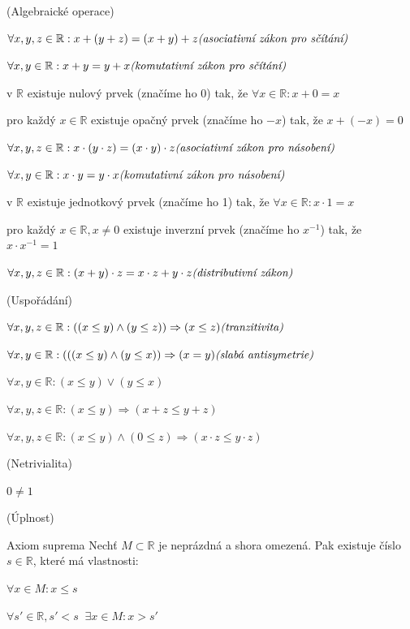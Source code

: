\begin{penumerate}
	\item (Algebraické operace)
	\begin{penumerate}
		\item $\forall x,y,z \in \mathbb{R} : x+(y+z) = (x+y)+z \hfill\textit{(asociativní zákon pro sčítání)}$
		\item $\forall x,y \in \mathbb{R} : x+y = y+x \hfill\textit{(komutativní zákon pro sčítání)}$
		\item v $\mathbb{R}$ existuje nulový prvek (značíme ho 0) tak, že $\forall x \in \mathbb{R}: x+0 = x$
		\item pro každý $x \in \mathbb{R}$ existuje opačný prvek (značíme ho $-x$) tak, že $x+(-x)=0$
		\item $\forall x,y,z \in \mathbb{R}: x\cdot (y\cdot z)=(x\cdot y)\cdot z \hfill\textit{(asociativní zákon pro násobení)}$
		\item $\forall x,y \in \mathbb{R} : x\cdot y = y\cdot x \hfill\textit{(komutativní zákon pro násobení)}$
		\item v $\mathbb{R}$ existuje jednotkový prvek (značíme ho 1) tak, že $\forall x \in \mathbb{R}: x\cdot 1=x$
		\item pro každý $x \in \mathbb{R}, x \neq 0$ existuje inverzní prvek (značíme ho $x^{-1}$) tak, že $x\cdot x^{-1}=1$
		\item $\forall x,y,z \in \mathbb{R}: (x+y)\cdot z = x\cdot z + y\cdot z \hfill\textit{(distributivní zákon)}$
	\end{penumerate}
	\item (Uspořádání)
	\begin{penumerate}
		\item $\forall x,y,z \in \mathbb{R}: ((x \le y) \wedge (y \le z)) \Rightarrow (x \le z) \hfill\textit{(tranzitivita)}$
		\item $\forall x,y \in \mathbb{R}: (((x \le y) \wedge (y \le x)) \Rightarrow (x=y) \hfill\textit{(slabá antisymetrie)}$
		\item $\forall x,y \in \mathbb{R}: (x \le y) \vee (y \le x)$
		\item $\forall x,y,z \in \mathbb{R}: (x \le y) \Rightarrow (x+z \le y+z)$
		\item $\forall x,y,z \in \mathbb{R}: (x \le y) \wedge (0 \le z) \Rightarrow (x\cdot z \le y\cdot z)$
	\end{penumerate}
	\item (Netrivialita)
	\begin{penumerate}
		\item $0 \neq 1$
	\end{penumerate}
	\item (Úplnost)
		\\\begin{definiceN}{Axiom suprema}
		Nechť $M \subset \mathbb{R}$ je neprázdná a shora omezená. Pak existuje číslo $s \in \mathbb{R}$, které má vlastnosti:
		\begin{penumerate}
			\item $\forall x \in M: x \le s$
			\item $\forall s' \in \mathbb{R}, s' < s\;\; \exists x \in M: x > s'$
		\end{penumerate}
		

\end{definiceN}
\end{penumerate}
